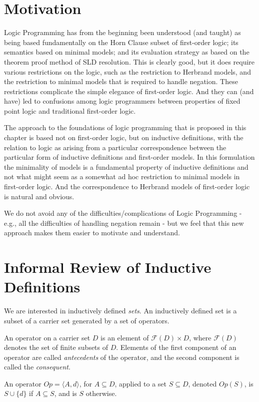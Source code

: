 \section{Motivation}
Logic Programming has from the beginning been understood (and taught)
as being based fundamentally on the Horn Clause subset of first-order
logic; its semantics based on minimal models; and its evaluation
strategy as based on the theorem proof method of SLD resolution.  This
is clearly good, but it does require various restrictions on the
logic, such as the restriction to Herbrand models, and the restriction
to minimal models that is required to handle negation.  These
restrictions complicate the simple elegance of first-order logic.  And
they can (and have) led to confusions among logic programmers between
properties of fixed point logic and traditional first-order logic.

The approach to the foundations of logic programming that is proposed
in this chapter is based not on first-order logic, but on inductive
definitions, with the relation to logic as arising from a particular
correspondence between the particular form of inductive definitions
and first-order models.  In this formulation the minimality of models
is a fundamental property of inductive definitions and not what might
seem as a somewhat ad hoc restriction to minimal models in first-order
logic.  And the correspondence to Herbrand models of first-order logic
is natural and obvious.

We do not avoid any of the difficulties/complications of Logic
Programming - e.g., all the difficulties of handling negation remain -
but we feel that this new approach makes them easier to motivate and
understand.

\section{Informal Review of Inductive Definitions}

We are interested in inductively defined {\em sets}.  An inductively
defined set is a subset of a carrier set generated by a set of
operators.

An operator on a carrier set $D$ is an element of $\mathcal{F}(D)
\times D$, where $\mathcal{F}(D)$ denotes the set of finite subsets of
$D$.  Elements of the first component of an operator are called {\em
  antecedents} of the operator, and the second component is called the
       {\em consequent}.

An operator $Op = \langle A, d\rangle$, for $A \subseteq D$, applied
to a set $S \subseteq D$, denoted $Op(S)$, is $S \cup \{d\}$ if
$A \subseteq S$, and is $S$ otherwise.

